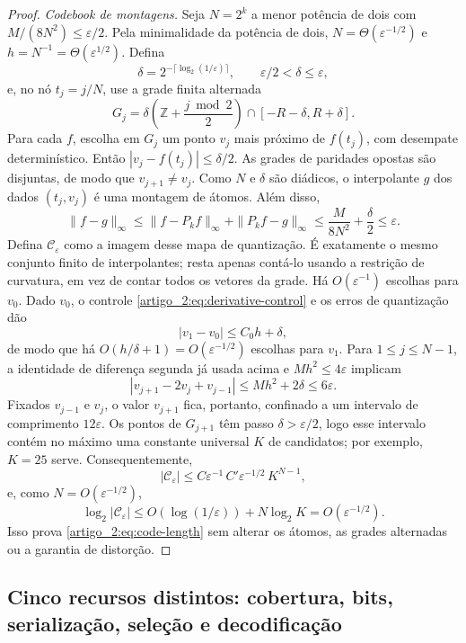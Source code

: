 \begin{proof}
\emph{Codebook de montagens.} Seja $N=2^k$ a menor potência de dois com $M/(8N^2)\le\varepsilon/2$. Pela minimalidade da potência de dois, $N=\Theta(\varepsilon^{-1/2})$ e $h=N^{-1}=\Theta(\varepsilon^{1/2})$. Defina
\[
 \delta=2^{-\lceil\log_2(1/\varepsilon)\rceil},
 \qquad \varepsilon/2<\delta\le\varepsilon,
\]
e, no nó $t_j=j/N$, use a grade finita alternada
\begin{equation}
 G_j=\delta\left(\mathbb{Z}+\frac{j\bmod2}{2}\right)
 \cap[-R-\delta,R+\delta].
 \label{artigo_2:eq:alternating-grid}
\end{equation}
Para cada $f$, escolha em $G_j$ um ponto $v_j$ mais próximo de $f(t_j)$, com desempate determinístico. Então $|v_j-f(t_j)|\le\delta/2$. As grades de paridades opostas são disjuntas, de modo que $v_{j+1}\neq v_j$. Como $N$ e $\delta$ são diádicos, o interpolante $g$ dos dados $(t_j,v_j)$ é uma montagem de átomos. Além disso,
\[
 \|f-g\|_\infty
 \le\|f-P_kf\|_\infty+\|P_kf-g\|_\infty
 \le\frac{M}{8N^2}+\frac\delta2\le\varepsilon.
\]
Defina $\mathcal C_\varepsilon$ como a imagem desse mapa de quantização.
É exatamente o mesmo conjunto finito de interpolantes; resta apenas contá-lo
usando a restrição de curvatura, em vez de contar todos os vetores da grade.
Há $O(\varepsilon^{-1})$ escolhas para $v_0$. Dado $v_0$, o controle
\eqref{artigo_2:eq:derivative-control} e os erros de quantização dão
\[
 |v_1-v_0|\le C_0h+\delta,
\]
de modo que há $O(h/\delta+1)=O(\varepsilon^{-1/2})$ escolhas para $v_1$.
Para $1\le j\le N-1$, a identidade de diferença segunda já usada acima e
$Mh^2\le4\varepsilon$ implicam
\[
 |v_{j+1}-2v_j+v_{j-1}|
 \le Mh^2+2\delta\le6\varepsilon.
\]
Fixados $v_{j-1}$ e $v_j$, o valor $v_{j+1}$ fica, portanto, confinado a um
intervalo de comprimento $12\varepsilon$. Os pontos de $G_{j+1}$ têm passo
$\delta>\varepsilon/2$, logo esse intervalo contém no máximo uma constante
universal $K$ de candidatos; por exemplo, $K=25$ serve. Consequentemente,
\[
 |\mathcal C_\varepsilon|
 \le C\varepsilon^{-1}\,C'\varepsilon^{-1/2}\,K^{N-1},
\]
e, como $N=O(\varepsilon^{-1/2})$,
\[
 \log_2|\mathcal C_\varepsilon|
 \le O(\log(1/\varepsilon))+N\log_2K
 =O(\varepsilon^{-1/2}).
\]
Isso prova \eqref{artigo_2:eq:code-length} sem alterar os átomos, as grades alternadas
ou a garantia de distorção.
\end{proof}

\subsection{Cinco recursos distintos: cobertura, bits, serialização, seleção e decodificação}

